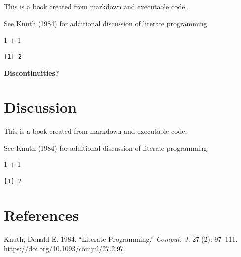 \documentclass[
  letterpaper,
  DIV=11,
  numbers=noendperiod]{scrreprt}
\newenvironment{Shaded}{\begin{snugshade}}{\end{snugshade}}
\newcommand{\DecValTok}[1]{\textcolor[rgb]{0.68,0.00,0.00}{#1}}
\newcommand{\SpecialCharTok}[1]{\textcolor[rgb]{0.37,0.37,0.37}{#1}}
\newlength{\cslhangindent}
\newlength{\cslentryspacingunit} %
\newenvironment{CSLReferences}[2] %
 {%
  \setlength{\parindent}{0pt}
  \ifodd #1
  \let\oldpar\par
  \def\par{\hangindent=\cslhangindent\oldpar}
  \fi
  \setlength{\parskip}{#2\cslentryspacingunit}
 }%
 {}
\theoremstyle{definition}
\theoremstyle{remark}
\begin{document}
This is a book created from markdown and executable code.

See Knuth (1984) for additional discussion of literate programming.

\begin{Shaded}
\begin{Highlighting}[]
\DecValTok{1} \SpecialCharTok{+} \DecValTok{1}
\end{Highlighting}
\end{Shaded}

\begin{verbatim}
[1] 2
\end{verbatim}

\textbf{Discontinuities?}


\hypertarget{discussion}{%
\chapter{Discussion}\label{discussion}}

This is a book created from markdown and executable code.

See Knuth (1984) for additional discussion of literate programming.

\begin{Shaded}
\begin{Highlighting}[]
\DecValTok{1} \SpecialCharTok{+} \DecValTok{1}
\end{Highlighting}
\end{Shaded}

\begin{verbatim}
[1] 2
\end{verbatim}

\cleardoublepage
{}
{}
\appendix

\hypertarget{references}{%
\chapter*{References}\label{references}}


\hypertarget{refs}{}
\begin{CSLReferences}{1}{0}
\leavevmode{}%
Knuth, Donald E. 1984. {``Literate Programming.''} \emph{Comput. J.} 27
(2): 97--111. \url{https://doi.org/10.1093/comjnl/27.2.97}.

\end{CSLReferences}
\end{document}
